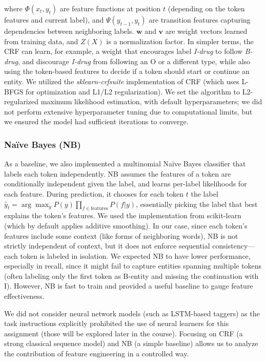 where $\Phi(x_t, y_t)$ are feature functions at position $t$ (depending on the token features and current label), and $\Psi(y_{t-1}, y_t)$ are transition features capturing dependencies between neighboring labels. $\mathbf{w}$ and $\mathbf{v}$ are weight vectors learned from training data, and $Z(X)$ is a normalization factor. In simpler terms, the CRF can learn, for example, a weight that encourages label \textit{I-drug} to follow \textit{B-drug}, and discourage \textit{I-drug} from following an O or a different type, while also using the token-based features to decide if a token should start or continue an entity. We utilized the \textit{sklearn-crfsuite} implementation of CRF (which uses L-BFGS for optimization and L1/L2 regularization). We set the algorithm to L2-regularized maximum likelihood estimation, with default hyperparameters; we did not perform extensive hyperparameter tuning due to computational limits, but we ensured the model had sufficient iterations to converge.

\subsubsection{Naïve Bayes (NB)}
As a baseline, we also implemented a multinomial Naïve Bayes classifier that labels each token independently. NB assumes the features of a token are conditionally independent given the label, and learns per-label likelihoods for each feature. During prediction, it chooses for each token $t$ the label $\hat{y}_t = \arg\max_y P(y) \prod_{f \in \text{features}} P(f | y)$, essentially picking the label that best explains the token's features. We used the implementation from scikit-learn~\cite{scikit-learn} (which by default applies additive smoothing). In our case, since each token's features include some context (like forms of neighboring words), NB is not strictly independent of context, but it does not enforce sequential consistency—each token is labeled in isolation. We expected NB to have lower performance, especially in recall, since it might fail to capture entities spanning multiple tokens (often labeling only the first token as B-entity and missing the continuation with I). However, NB is fast to train and provided a useful baseline to gauge feature effectiveness.

We did not consider neural network models (such as LSTM-based taggers) as the task instructions explicitly prohibited the use of neural learners for this assignment (those will be explored later in the course). Focusing on CRF (a strong classical sequence model) and NB (a simple baseline) allows us to analyze the contribution of feature engineering in a controlled way.
